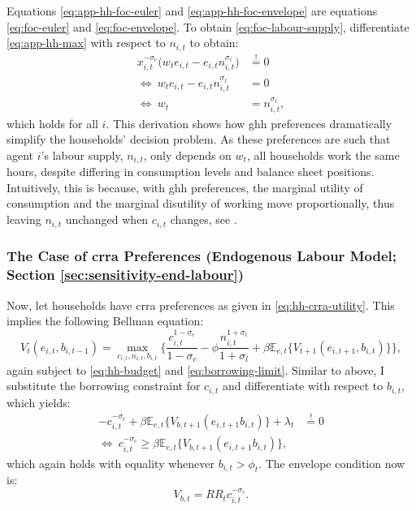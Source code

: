 \documentclass[a4paper,12pt]{article} %
\numberwithin{equation}{section} %
\numberwithin{figure}{section}
\numberwithin{table}{section}
\begin{document}
\begin{refsection}
\begin{appendices}
Equations \eqref{eq:app-hh-foc-euler} and \eqref{eq:app-hh-foc-envelope} are equations \eqref{eq:foc-euler} and \eqref{eq:foc-envelope}. To obtain \eqref{eq:foc-labour-supply}, differentiate \eqref{eq:app-hh-max} with respect to $n_{i,t}$ to obtain:
\begin{align}
    x_{i,t}^{-\sigma_c} \big( w_t e_{i,t} - e_{i,t} n_{i,t}^{\sigma_l} \big) &\overset{!}{=} 0 \nonumber \\
    \Leftrightarrow \ w_t e_{i,t} - e_{i,t} n_{i,t}^{\sigma_l} &= 0 \nonumber \\
    \Leftrightarrow \  w_t &= n_{i,t}^{\sigma_l}, \label{eq:app-hh-foc-labour}
\end{align}
which holds for all $i$. This derivation shows how \Gls{ghh} preferences dramatically simplify the households' decision problem. As these preferences are such that agent $i$'s labour supply, $n_{i,t}$, only depends on $w_t$, all households work the same hours, despite differing in consumption levels and balance sheet positions. Intuitively, this is because, with \Gls{ghh} preferences, the marginal utility of consumption and the marginal disutility of working move proportionally, thus leaving $n_{i,t}$ unchanged when $c_{i,t}$ changes, see \textcite{auclert2017}.

\subsubsection*{The Case of \Gls{crra} Preferences (Endogenous Labour Model; Section \ref{sec:sensitivity-end-labour})}

Now, let households have \Gls{crra} preferences as given in \eqref{eq:hh-crra-utility}. This implies the following Bellman equation:
\begin{equation}
    V_t (e_{i,t}, b_{i,t-1}) = \max_{c_{i,t}, n_{i,t}, b_{i,t}} \Bigg\{ \frac{c_{i,t}^{1-\sigma_c}}{1-\sigma_c} - \phi \frac{n_{i,t}^{1+\sigma_l}}{1+\sigma_l} + \beta \mathbb{E}_{e,t} \{ V_{t+1} (e_{i,t+1}, b_{i,t}) \} \Bigg\}, \label{eq:app-hh-bellman-crra}
\end{equation}
again subject to \eqref{eq:hh-budget} and \eqref{eq:borrowing-limit}. Similar to above, I substitute the borrowing constraint for $c_{i,t}$ and differentiate with respect to $b_{i,t}$, which yields:
\begin{align}
    -c_{i,t}^{-\sigma_c} + \beta \mathbb{E}_{e,t} \{ V_{b,t+1} (e_{i,t+1} b_{i,t} ) \} + \lambda_t &\overset{!}{=} 0 \nonumber \\
    \Leftrightarrow \ c_{i,t}^{-\sigma_c} \ge \beta \mathbb{E}_{e,t} \{ V_{b,t+1} (e_{i,t+1} b_{i,t} ) \}, \label{eq:app-hh-foc-euler-crra}
\end{align}
which again holds with equality whenever $b_{i,t} > \phi_t$. The envelope condition now is:
\begin{equation}
    V_{b,t} = RR_t c_{i,t}^{-\sigma_c}. \label{eq:app-hh-foc-envelope-crra}
\end{equation}


\end{appendices}
\end{refsection}
\end{document}
